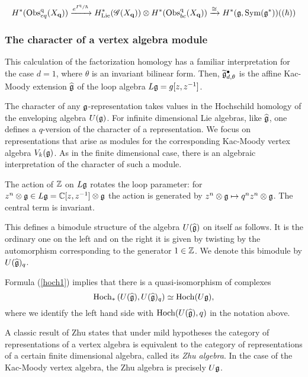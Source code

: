 \[
H^*({\rm Obs}^{{\rm q}}_{eq}(X_{\bf q})) \xrightarrow{e^{I^{\rm q} / \hbar}} H^*_{\rm Lie}(\mathscr G(X_{\bf q})) \otimes H^*({\rm Obs}^{\rm q}_{bc} (X_{\bf q})) \xrightarrow{\cong} H^*(\mathfrak g, {\rm Sym}(\mathfrak g^*)) ((\hbar))
\]

\subsubsection{The character of a vertex algebra module}

This calculation of the factorization homology has a familiar interpretation for the case $d=1$, where $\theta$ is an invariant bilinear form. 
Then, $\widetilde{\mathfrak g}^\bullet_{d,\theta}$ is the affine Kac-Moody extension $\widehat{\mathfrak g}$ of the loop algebra $L\mathfrak g = g [z,z^{-1}]$. 

The character of any $\mathfrak g$-representation takes values in the Hochschild homology of the enveloping algebra $U(\mathfrak g)$. 
For infinite dimensional Lie algebras, like $\widehat{\mathfrak g}$, one defines a $q$-version of the character of a representation.
We focus on representations that arise as modules for the corresponding Kac-Moody vertex algebra $V_{k}(\mathfrak g)$. 
As in the finite dimensional case, there is an algebraic interpretation of the character of such a module. 

The action of $\mathbb Z$ on $L\mathfrak g$ rotates the loop parameter: for $z^n \otimes \mathfrak g \in L \mathfrak g = \mathbb C[z,z^{-1}] \otimes \mathfrak g$ the action is generated by $z^n \otimes \mathfrak g \mapsto q^n z^n \otimes \mathfrak g$. 
The central term is invariant. 

This defines a bimodule structure of the algebra $U(\widehat{\mathfrak g})$ on itself as follows.
It is the ordinary one on the left and on the right it is given by twisting by the automorphism corresponding to the generator $1 \in \mathbb Z$. 
We denote this bimodule by $U(\widehat{\mathfrak g})_{q}$.

Formula (\ref{hoch1}) implies that there is a quasi-isomorphism of complexes
\[
{\rm Hoch}_*\left(U(\widehat{\mathfrak g}), U(\widehat{\mathfrak g})_q \right) \simeq {\rm Hoch}(U \mathfrak g) ,
\]
where we identify the left hand side with ${\rm Hoch}(U(\widehat{\mathfrak g}), q)$ in the notation above. 

A classic result of Zhu \cite{Zhu} states that under mild hypotheses the category of representations of a vertex algebra is equivalent to the category of representations of a certain finite dimensional algebra, called its {\em Zhu algebra}. 
In the case of the Kac-Moody vertex algebra, the Zhu algebra is precisely $U\mathfrak g$. 

